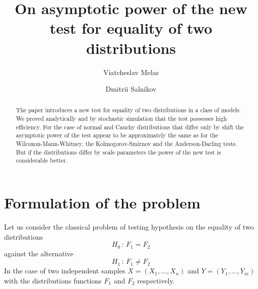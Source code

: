 \documentclass{svproc}
\begin{document}

\mainmatter              %

\title{On asymptotic power of the new test for equality of two distributions}

\author{Viatcheslav Melas \and Dmitrii Salnikov}


\maketitle              %

\begin{abstract}
The paper introduces a new test for equality of two distributions in a class of models.  We proved analytically and by stochastic simulation that the test possesses high efficiency. For the case of normal and Cauchy distributions that differ only by shift the asymptotic power of the test appear to be approximately the same as for the Wilcoxon-Mann-Whitney, the Kolmogorov-Smirnov and the Anderson-Darling tests. But if the distributions differ by scale parameters the power of the new test is considerable better.

\end{abstract}





\section{Formulation of the problem}
\label{S:1}
Let us consider the classical problem of testing hypothesis on the equality of two distributions
\begin{equation}
  \label{H0}
  H_0\,:\,F_1 = F_2
\end{equation}
against the alternative
\begin{equation}
  \label{H1}
  H_1\,:\,F_1 \not= F_2
\end{equation}
In the case of two independent samples $X=(X_{1},\ldots, X_{n})$ and $Y=(Y_{1},\ldots, Y_{m})$ with the distributions functions $F_1$ and $F_2$ respectively.
\end{document}

